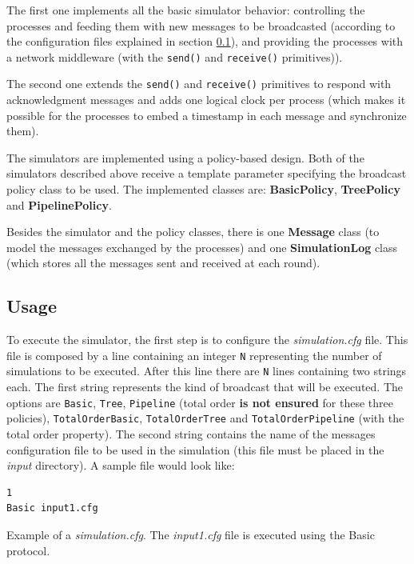 \documentclass[a4paper, 11pt]{article}
\begin{document}
	The first one implements all the basic simulator behavior: controlling the processes and feeding them with new messages to be broadcasted (according to the configuration files explained in section \ref{subsec:usage}), and providing the processes with a network middleware (with the \texttt{send()} and \texttt{receive()} primitives)). 
	
	The second one extends the \texttt{send()} and \texttt{receive()} primitives to respond with acknowledgment messages and adds one logical clock per process (which makes it possible for the processes to embed a timestamp in each message and synchronize them).

	The simulators are implemented using a policy-based design. Both of the simulators described above receive a template parameter specifying the broadcast policy class to be used. The implemented classes are: \textbf{BasicPolicy}, \textbf{TreePolicy} and \textbf{PipelinePolicy}.
	
	Besides the simulator and the policy classes, there is one \textbf{Message} class (to model the messages exchanged by the processes) and one \textbf{SimulationLog} class (which stores all the messages sent and received at each round).


\subsection{Usage}
\label{subsec:usage}
	To execute the simulator, the first step is to configure the \textit{simulation.cfg} file. This file is composed by a line containing an integer \texttt{N} representing the number of simulations to be executed. After  this line there are \texttt{N} lines containing two strings each. The first string represents the kind of broadcast that will be executed. The options are \texttt{Basic}, \texttt{Tree}, \texttt{Pipeline} (total order \textbf{is not ensured} for these three policies), \texttt{TotalOrderBasic}, \texttt{TotalOrderTree} and \texttt{TotalOrderPipeline} (with the total order property). The second string contains the name of the messages configuration file to be used in the simulation (this file must be placed in the \textit{input} directory). A sample file would look like:

\begin{file}
\begin{verbatim}
1
Basic input1.cfg
\end{verbatim}
\caption{Example of a \textit{simulation.cfg}. The \textit{input1.cfg} file is executed using the Basic protocol.}
\end{file}
\end{document}
